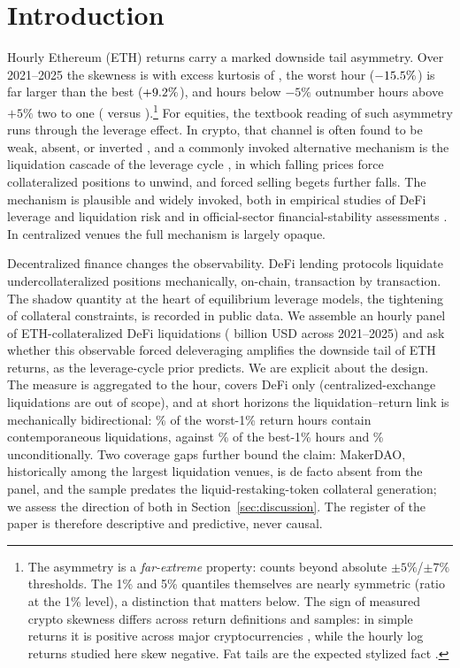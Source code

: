 \section{Introduction}
\label{sec:intro}

Hourly Ethereum (ETH) returns carry a marked downside tail asymmetry. Over
2021--2025 the skewness is \SkewEth{} with excess kurtosis of \KurtEth{}, the
worst hour ($-15.5\%$) is far larger than the best ($+9.2\%$), and hours
below $-5\%$ outnumber hours above $+5\%$ two to one
(\FarFiveDown{} versus \FarFiveUp).\footnote{The asymmetry is a
\emph{far-extreme} property: counts beyond absolute $\pm 5\%$/$\pm 7\%$
thresholds. The 1\% and 5\% quantiles themselves are nearly symmetric (ratio
\QratioOnePct{} at the 1\% level), a distinction that matters below. The
sign of measured crypto skewness differs across return definitions and
samples: in simple returns it is positive across major cryptocurrencies
\citep{liu2021}, while the hourly log returns studied here skew negative. Fat tails are
the expected stylized fact \citep{cont2001,osterrieder2017}.}
For equities, the textbook reading of such asymmetry runs through the
leverage effect. In crypto, that channel is often found to be weak, absent, or inverted
\citep{baur2018,brini2022,aharon2023}, and a commonly invoked alternative
mechanism is the liquidation cascade of the leverage cycle
\citep{geanakoplos2010,brunnermeier2009}, in which falling prices force
collateralized positions to unwind, and forced selling begets further falls.
The mechanism is plausible and widely invoked, both in empirical studies of
DeFi leverage and liquidation risk \citep{perez2021} and in official-sector
financial-stability assessments \citep{oecd2023,fsb2023}. In centralized venues the full mechanism is largely opaque.

Decentralized finance changes the observability. DeFi lending protocols
liquidate undercollateralized positions mechanically, on-chain, transaction
by transaction. The shadow quantity at the heart of equilibrium leverage
models, the tightening of collateral constraints, is recorded in public
data. We assemble an hourly panel of ETH-collateralized DeFi liquidations
(\LiqTotalBn{} billion USD across 2021--2025) and ask whether this observable
forced deleveraging amplifies the downside tail of ETH returns, as the
leverage-cycle prior predicts. We are explicit about the design. The
measure is aggregated to the hour, covers DeFi only (centralized-exchange
liquidations are out of scope), and at short horizons the liquidation--return
link is mechanically bidirectional: \PLiqWorstOne\% of the worst-1\% return
hours contain contemporaneous liquidations, against \PLiqBestOne\% of the
best-1\% hours and \PLiqAll\% unconditionally. Two coverage gaps further bound the claim: MakerDAO, historically among the largest liquidation venues, is de facto absent from the panel, and the sample predates the liquid-restaking-token collateral generation; we assess the direction of both in Section~\ref{sec:discussion}. The register of the paper is
therefore descriptive and predictive, never causal.

